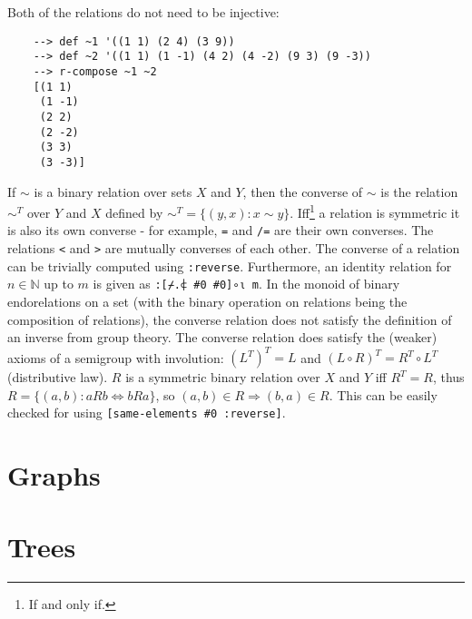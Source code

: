 Both of the relations do not need to be injective:

\begin{Verbatim}
    --> def ~1 '((1 1) (2 4) (3 9))
    --> def ~2 '((1 1) (1 -1) (4 2) (4 -2) (9 3) (9 -3))
    --> r-compose ~1 ~2
    [(1 1)
     (1 -1)
     (2 2)
     (2 -2)
     (3 3)
     (3 -3)]
\end{Verbatim}

If $\sim$ is a binary relation over sets $X$ and $Y$, then the converse of $\sim$ is the relation $\sim^T$ over $Y$ and $X$ defined by $\displaystyle \sim^T = \{(y,x):x\sim y\}$. Iff\footnote{If and only if.} a relation is symmetric it is also its own converse - for example, \verb|=| and \verb|/=| are their own converses. The relations \verb|<| and \verb|>| are mutually converses of each other. The converse of a relation can be trivially computed using \verb|:reverse|. Furthermore, an identity relation for $n \in \mathbb{N}$ up to $m$ is given as \verb|:[⌿.⍧ #0 #0]∘⍳ m|. In the monoid of binary endorelations on a set (with the binary operation on relations being the composition of relations), the converse relation does not satisfy the definition of an inverse from group theory. The converse relation does satisfy the (weaker) axioms of a semigroup with involution: $\left(L^T\right)^T=L$ and $(L\circ R)^T=R^T\circ L^T$ (distributive law). $R$ is a symmetric binary relation over $X$ and $Y$ iff $R^T = R$, thus $R = \{(a,b): a R b \Leftrightarrow b R a \}$, so $(a,b)\in R \Rightarrow (b,a)\in R$. This can be easily checked for using \verb|[same-elements #0 :reverse]|.

\section{Graphs}

\section{Trees}

